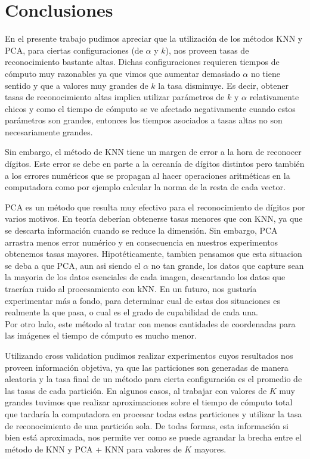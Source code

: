 \section{Conclusiones}

En el presente trabajo pudimos apreciar que la utilización de los métodos KNN y PCA, para ciertas configuraciones (de $\alpha$ y $k$), nos proveen tasas de reconocimiento bastante altas. Dichas configuraciones requieren tiempos de cómputo muy razonables ya que vimos que aumentar demasiado $\alpha$ no tiene sentido y que a valores muy grandes de $k$ la tasa disminuye. Es decir, obtener tasas de reconocimiento altas implica utilizar parámetros de $k$ y $\alpha$ relativamente chicos y como el tiempo de cómputo se ve afectado negativamente cuando estos parámetros son grandes, entonces los tiempos asociados a tasas altas no son necesariamente grandes.

Sin embargo, el método de KNN tiene un margen de error a la hora de reconocer dígitos. Este error se debe en parte a la cercanía de dígitos distintos pero también a los errores numéricos que se propagan al hacer operaciones aritméticas en la computadora como por ejemplo calcular la norma de la resta de cada vector.

PCA es un método que resulta muy efectivo para el reconocimiento de dígitos por varios motivos. En teoría deberían obtenerse tasas menores que con KNN, ya que se descarta información cuando se reduce la dimensión. Sin embargo, PCA arrastra menos error numérico y en consecuencia en nuestros experimentos obtenemos tasas mayores. Hipotéticamente, tambien pensamos que esta situacion se deba a que PCA, aun asi siendo el $\alpha$ no tan grande, los datos que capture sean la mayoria de los datos esenciales de cada imagen, descartando los datos que traerían ruido al procesamiento con kNN. En un futuro, nos gustaría experimentar más a fondo, para determinar cual de estas dos situaciones es realmente la que pasa, o cual es el grado de cupabilidad de cada una. \\
Por otro lado, este método al tratar con menos cantidades de coordenadas para las imágenes el tiempo de cómputo es mucho menor.

Utilizando cross validation pudimos realizar experimentos cuyos resultados nos proveen información objetiva, ya que las particiones son generadas de manera aleatoria y la tasa final de un método para cierta configuración es el promedio de las tasas de cada partición. En algunos casos, al trabajar con valores de $K$ muy grandes tuvimos que realizar aproximaciones sobre el tiempo de cómputo total que tardaría la computadora en procesar todas estas particiones y utilizar la tasa de reconocimiento de una partición sola. De todas formas, esta información si bien está aproximada, nos permite ver como se puede agrandar la brecha entre el método de KNN y PCA + KNN para valores de $K$ mayores.

